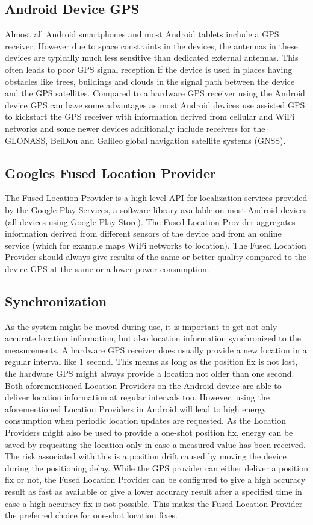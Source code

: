 \subsection{Android Device GPS}
Almost all Android smartphones and most Android tablets include a GPS receiver. However due to space constraints in the devices, the antennas in these devices are typically much less sensitive than dedicated external antennas. This often leads to poor GPS signal reception if the device is used in places having obstacles like trees, buildings and clouds in the signal path between the device and the GPS satellites. Compared to a hardware GPS receiver using the Android device GPS can have some advantages as most Android devices use assisted GPS to kickstart the GPS receiver with information derived from cellular and WiFi networks and some newer devices additionally include receivers for the GLONASS, BeiDou and Galileo global navigation satellite systems (GNSS).

\subsection{Googles Fused Location Provider}
The Fused Location Provider is a high-level API for localization services provided by the Google Play Services, a software library available on most Android devices (all devices using Google Play Store). The Fused Location Provider aggregates information derived from different sensors of the device and from an online service (which for example maps WiFi networks to location). The Fused Location Provider should always give results of the same or better quality compared to the device GPS at the same or a lower power consumption.

\subsection{Synchronization}
As the system might be moved during use, it is important to get not only accurate location information, but also location information synchronized to the measurements. A hardware GPS receiver does usually provide a new location in a regular interval like 1 second. This means as long as the position fix is not lost, the hardware GPS might always provide a location not older than one second. Both aforementioned Location Providers on the Android device are able to deliver location information at regular intervals too. However, using the aforementioned Location Providers in Android will lead to high energy consumption when periodic location updates are requested. As the Location Providers might also be used to provide a one-shot position fix, energy can be saved by requesting the location only in case a measured value has been received. The risk associated with this is a position drift caused by moving the device during the positioning delay. While the GPS provider can either deliver a position fix or not, the Fused Location Provider can be configured to give a high accuracy result as fast as available or give a lower accuracy result after a specified time in case a high accuracy fix is not possible. This makes the Fused Location Provider the preferred choice for one-shot location fixes.

